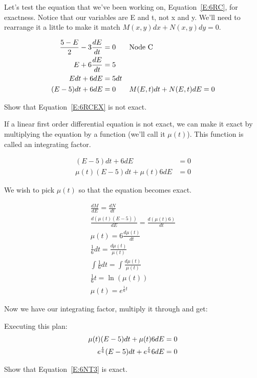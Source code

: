 Let's test the equation that we've been working on, Equation~\eqref{E:6RC}, for exactness. Notice that our variables are E and t, not x and y. We'll need to rearrange it a little to make it match $M(x,y)dx + N(x,y)dy = 0$.

\begin{align}
\frac{5-E}{2}-3\frac{dE}{dt}&=0 &&\text{Node C}\notag\\
E+6\frac{dE}{dt}&=5 \notag\\
Edt+6dE&=5dt \notag\\
(E-5)dt+6dE&=0 &&M(E,t)dt+N(E,t)dE=0 \label{E:6RCEX}
\end{align}

\begin{blevel}
Show that Equation~\eqref{E:6RCEX} is not exact.
\end{blevel}

If a linear first order differential equation is not exact, we can make it exact by multiplying the equation by a function (we'll call it $\mu(t)$). This function is called an integrating factor.

\begin{align*}
(E-5)dt+6dE&=0\\
\mu(t)(E-5)dt+\mu(t)6dE&=0
\end{align*}

We wish to pick $\mu(t)$ so that the equation becomes exact.

\begin{align*}
\frac{dM}{dE}=\frac{dN}{dt}\\
\frac{d(\mu(t)(E-5))}{dE}=\frac{d(\mu(t)6)}{dt}\\
\mu(t)=6\frac{d\mu(t)}{dt}\\
\frac{1}{6}dt=\frac{d\mu(t)}{\mu(t)}\\
\int \frac{1}{6}dt=\int \frac{d\mu(t)}{\mu(t)}\\
\frac{1}{6}t=\ln(\mu(t))\\
\mu(t)=e^{\frac{1}{6}t}
\end{align*}

Now we have our integrating factor, multiply it through and get:

Executing this plan:
\begin{align}
\mu(t)(E-5)dt+\mu(t)6dE&=0 \notag\\
e^{\frac{t}{6}}(E-5)dt+e^{\frac{t}{6}}6dE&=0 \label{E:6NT3}
\end{align}

\begin{blevel}
Show that Equation~\eqref{E:6NT3} is exact.
\end{blevel}

